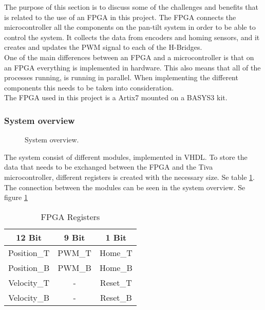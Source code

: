 \documentclass[../../../main]{subfiles}
\begin{document}
The purpose of this section is to discuss some of the challenges and benefits that is related to the use of an FPGA in this project.
The FPGA connects the  microcontroller all the components on the pan-tilt system in order to be able to control the system. It collects the data from encoders and homing sensors, and it creates and updates the PWM signal to each of the H-Bridges.
\\
One of the main differences between an FPGA and a microcontroller is that on an FPGA everything is implemented in hardware. This also means that all of the processes running, is running in parallel. When implementing the different components this needs to be taken into consideration.
\\
The FPGA used in this project is a Artix7 mounted on a BASYS3 kit.  
\subsubsection{System overview}%
\label{sub:system_overview}

\begin{figure}[H]
  \centering
  \def\svgwidth{\textwidth}
  
  \caption{System overview.}
  \label{fig:FPGA_system_overview}
\end{figure}

The system consist of different modules, implemented in VHDL. 
To store the data that needs to be exchanged between the FPGA and the Tiva microcontroller, different registers is created with the necessary size. Se table \ref{table:FPGA_registers}.
\\
The connection between the modules can be seen in the system overview. Se figure \ref{fig:FPGA_system_overview}
\begin{table}[H]
\begin{tabular}{|c|c|c|}
\hline
\textbf{12 Bit} & \textbf{9 Bit} & \textbf{1 Bit} \\ \hline
Position\_T     & PWM\_T         & Home\_T        \\ \hline
Position\_B     & PWM\_B         & Home\_B        \\ \hline
Velocity\_T     & -              & Reset\_T       \\ \hline
Velocity\_B     & -              & Reset\_B       \\ \hline
\end{tabular}
\caption{FPGA Registers}
\label{table:FPGA_registers}
\end{table}
\end{document}
